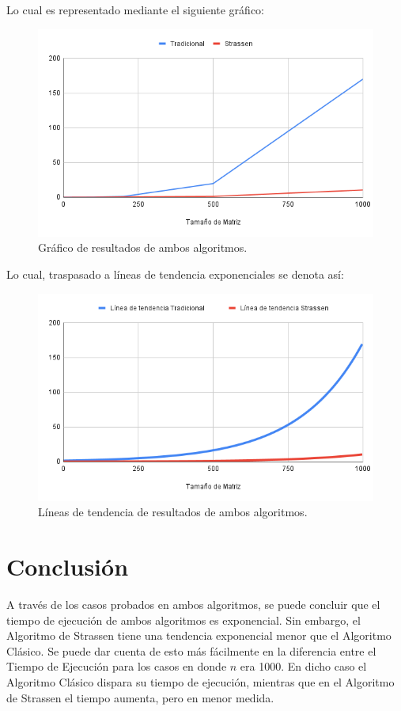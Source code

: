 \documentclass[a4paper,11pt]{article}
\begin{document}
Lo cual es representado mediante el siguiente gráfico:
\begin{figure}[h]
    \centering
    \includegraphics[width=12cm]{Imagenes/graph1.png}
    \caption{Gráfico de resultados de ambos algoritmos.}
    \label{fig:graph1}
\end{figure}
\newpage
Lo cual, traspasado a líneas de tendencia exponenciales se denota así:
\begin{figure}[h]
    \centering
    \includegraphics[width=12cm]{Imagenes/graph2.png}
    \caption{Líneas de tendencia de resultados de ambos algoritmos.}
    \label{fig:graph2}
\end{figure}

\section{Conclusión}
A través de los casos probados en ambos algoritmos, se puede concluir que el tiempo de ejecución de ambos algoritmos es exponencial. Sin embargo, el Algoritmo de Strassen tiene una tendencia exponencial menor que el Algoritmo Clásico. Se puede dar cuenta de esto más fácilmente en la diferencia entre el Tiempo de Ejecución para los casos en donde $n$ era 1000. En dicho caso el Algoritmo Clásico dispara su tiempo de ejecución, mientras que en el Algoritmo de Strassen el tiempo aumenta, pero en menor medida.\\
\end{document}
